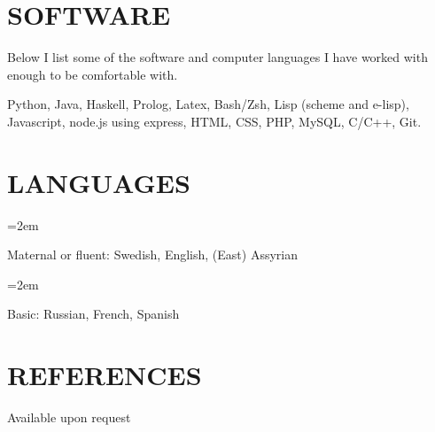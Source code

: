 \documentclass[paper=a4,fontsize=11pt]{scrartcl} %
\newlength{\spacebox}
\newcommand{\NewPart}[1]{\section*{\uppercase{#1}}}
\newcommand{\PersonalEntry}[2]{
		\noindent\hangindent=2em\hangafter=0 %
		\parbox{\spacebox}{        %
		\textit{#1}}		       %
		\hspace{1.5em} #2 \par}    %
\newcommand{\SkillsEntry}[2]{      %
		\noindent\hangindent=2em\hangafter=0 %
		\parbox{\spacebox}{        %
		\textit{#1}}			   %
		\hspace{1.5em} #2 \par}    %
\begin{document}
\NewPart{Software}{}

Below I list some of the software and computer languages I have worked with enough to be comfortable with.

Python, Java, Haskell, Prolog, Latex, Bash/Zsh, Lisp (scheme and e-lisp), Javascript, node.js using express, HTML, CSS, PHP, MySQL, C/C++, Git.


\NewPart{Languages}{}

\SkillsEntry{}{Maternal or fluent: Swedish, English, (East) Assyrian}
\SkillsEntry{}{Basic: Russian, French, Spanish}


\NewPart{References}{}
Available upon request
\end{document}
